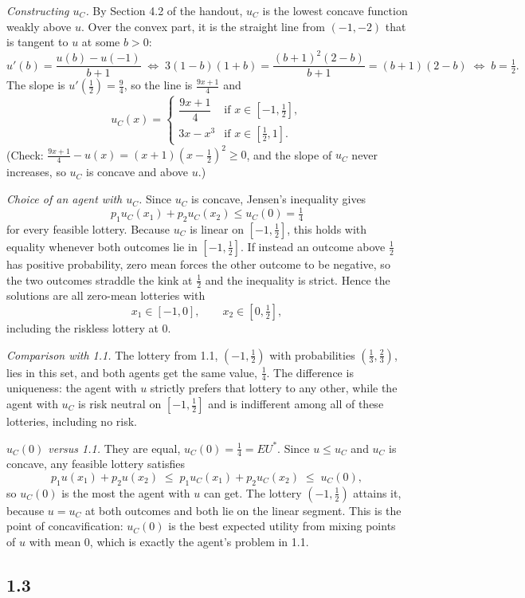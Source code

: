 \documentclass[12pt,letterpaper]{article}
\begin{document}
\textit{Constructing $u_C$.} By Section 4.2 of the handout, $u_C$ is the lowest concave function weakly above $u$. Over the convex part, it is the straight line from $(-1,-2)$ that is tangent to $u$ at some $b>0$:
\[
u'(b)=\frac{u(b)-u(-1)}{b+1}
\;\Longleftrightarrow\;
3(1-b)(1+b)=\frac{(b+1)^2(2-b)}{b+1}=(b+1)(2-b)
\;\Longleftrightarrow\;
b=\tfrac12 .
\]
The slope is $u'(\tfrac12)=\tfrac94$, so the line is $\tfrac{9x+1}{4}$ and
\[
u_C(x)=\begin{cases}
\dfrac{9x+1}{4} & \text{if } x\in[-1,\tfrac12],\\[8pt]
3x-x^3 & \text{if } x\in[\tfrac12,1].
\end{cases}
\]
(Check: $\tfrac{9x+1}{4}-u(x)=(x+1)(x-\tfrac12)^2\ge0$, and the slope of $u_C$ never increases, so $u_C$ is concave and above $u$.)

\textit{Choice of an agent with $u_C$.} Since $u_C$ is concave, Jensen's inequality gives
\[
p_1u_C(x_1)+p_2u_C(x_2)\le u_C(0)=\tfrac14
\]
for every feasible lottery. Because $u_C$ is linear on $[-1,\tfrac12]$, this holds with equality whenever both outcomes lie in $[-1,\tfrac12]$. If instead an outcome above $\tfrac12$ has positive probability, zero mean forces the other outcome to be negative, so the two outcomes straddle the kink at $\tfrac12$ and the inequality is strict. Hence the solutions are all zero-mean lotteries with
\[
x_1\in[-1,0],\qquad x_2\in[0,\tfrac12],
\]
including the riskless lottery at $0$.

\textit{Comparison with 1.1.} The lottery from 1.1, $(-1,\tfrac12)$ with probabilities $(\tfrac13,\tfrac23)$, lies in this set, and both agents get the same value, $\tfrac14$. The difference is uniqueness: the agent with $u$ strictly prefers that lottery to any other, while the agent with $u_C$ is risk neutral on $[-1,\tfrac12]$ and is indifferent among all of these lotteries, including no risk.

\textit{$u_C(0)$ versus 1.1.} They are equal, $u_C(0)=\tfrac14=EU^*$. Since $u\le u_C$ and $u_C$ is concave, any feasible lottery satisfies
\[
p_1u(x_1)+p_2u(x_2)\;\le\;p_1u_C(x_1)+p_2u_C(x_2)\;\le\;u_C(0),
\]
so $u_C(0)$ is the most the agent with $u$ can get. The lottery $(-1,\tfrac12)$ attains it, because $u=u_C$ at both outcomes and both lie on the linear segment. This is the point of concavification: $u_C(0)$ is the best expected utility from mixing points of $u$ with mean $0$, which is exactly the agent's problem in 1.1.

\subsection*{1.3}
\end{document}
